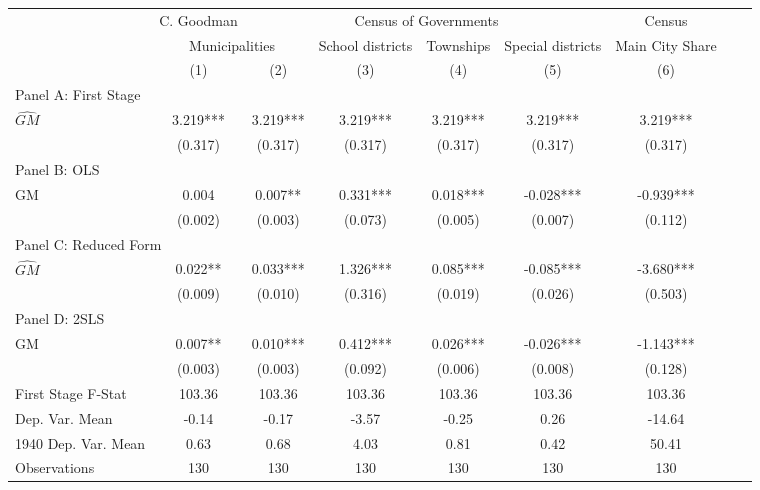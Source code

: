  \begin{tabular}{l*{8}{c}} \toprule
&\multicolumn{1}{c}{C. Goodman}&\multicolumn{4}{c}{Census of Governments}&\multicolumn{1}{c}{Census}\\\cmidrule(lr){2-2}\cmidrule(lr){3-6}\cmidrule(lr){7-7}
&\multicolumn{2}{c}{Municipalities}&\multicolumn{1}{c}{School districts}&\multicolumn{1}{c}{Townships}&\multicolumn{1}{c}{Special districts}&\multicolumn{1}{c}{Main City Share}\\\cmidrule(lr){2-3}\cmidrule(lr){4-6}\cmidrule(lr){7-7}
&\multicolumn{1}{c}{(1)}&\multicolumn{1}{c}{(2)}&\multicolumn{1}{c}{(3)}&\multicolumn{1}{c}{(4)}&\multicolumn{1}{c}{(5)}&\multicolumn{1}{c}{(6)}\\
\cmidrule(lr){1-7}
\multicolumn{6}{l}{Panel A: First Stage}\\
\cmidrule(lr){1-7}
$\widehat{GM}$  &    3.219***&    3.219***&    3.219***&    3.219***&    3.219***&    3.219***\\
                &  (0.317)   &  (0.317)   &  (0.317)   &  (0.317)   &  (0.317)   &  (0.317)   \\
\cmidrule(lr){1-7}
\multicolumn{6}{l}{Panel B: OLS}\\
\cmidrule(lr){1-7}
GM              &    0.004   &    0.007** &    0.331***&    0.018***&   -0.028***&   -0.939***\\
                &  (0.002)   &  (0.003)   &  (0.073)   &  (0.005)   &  (0.007)   &  (0.112)   \\
\cmidrule(lr){1-7}
\multicolumn{6}{l}{Panel C: Reduced Form}\\
\cmidrule(lr){1-7}
$\widehat{GM}$  &    0.022** &    0.033***&    1.326***&    0.085***&   -0.085***&   -3.680***\\
                &  (0.009)   &  (0.010)   &  (0.316)   &  (0.019)   &  (0.026)   &  (0.503)   \\
\cmidrule(lr){1-7}
\multicolumn{6}{l}{Panel D: 2SLS}\\
\cmidrule(lr){1-7}
GM              &    0.007** &    0.010***&    0.412***&    0.026***&   -0.026***&   -1.143***\\
                &  (0.003)   &  (0.003)   &  (0.092)   &  (0.006)   &  (0.008)   &  (0.128)   \\
\midrule
First Stage F-Stat&   103.36   &   103.36   &   103.36   &   103.36   &   103.36   &   103.36   \\
Dep. Var. Mean  &    -0.14   &    -0.17   &    -3.57   &    -0.25   &     0.26   &   -14.64   \\
1940 Dep. Var. Mean&     0.63   &     0.68   &     4.03   &     0.81   &     0.42   &    50.41   \\
Observations    &      130   &      130   &      130   &      130   &      130   &      130   \\
 \bottomrule \end{tabular}
